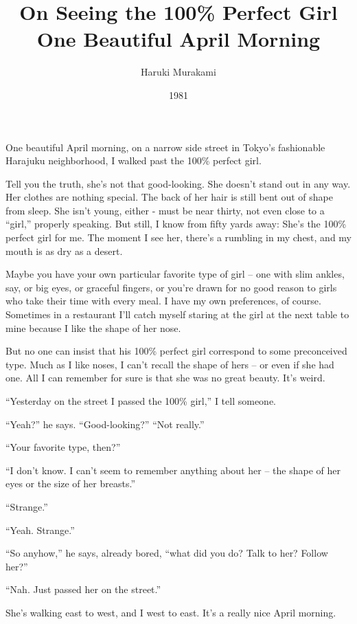 \documentclass[10pt,a4paper]{article}
\begin{document}
\title{On Seeing the 100\% Perfect Girl One Beautiful April Morning}
\date{1981}
\author{Haruki Murakami}
\maketitle
    
\thispagestyle{plain}
\setcounter{page}{2}
\linenumbers
One beautiful April morning, on a narrow side street in Tokyo’s fashionable Harajuku neighborhood, I walked past the 100\% perfect girl.

Tell you the truth, she’s not that good-looking. She doesn’t stand out in any way. Her clothes are nothing special. The back of her hair is still bent out of shape from sleep. She isn’t young, either - must be near thirty, not even close to a “girl,” properly speaking. But still, I know from fifty yards away: She’s the 100\% perfect girl for me. The moment I see her, there’s a rumbling in my chest, and my mouth is as dry as a desert.

Maybe you have your own particular favorite type of girl -- one with slim ankles, say, or big eyes, or graceful fingers, or you’re drawn for no good reason to girls who take their time with every meal. I have my own preferences, of course. Sometimes in a restaurant I’ll catch myself staring at the girl at the next table to mine because I like the shape of her nose.

But no one can insist that his 100\% perfect girl correspond to some preconceived type. Much as I like noses, I can’t recall the shape of hers -- or even if she had one. All I can remember for sure is that she was no great beauty. It’s weird.

“Yesterday on the street I passed the 100\% girl,” I tell someone.

“Yeah?” he says. “Good-looking?”
“Not really.”

“Your favorite type, then?”

“I don’t know. I can’t seem to remember anything about her -- the shape of her eyes or the size of her breasts.”

“Strange.”

“Yeah. Strange.”

“So anyhow,” he says, already bored, “what did you do? Talk to her? Follow her?”

“Nah. Just passed her on the street.”

She’s walking east to west, and I west to east. It’s a really nice April morning.
\end{document}
